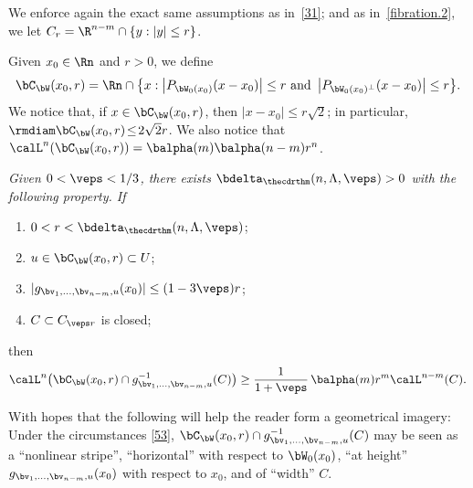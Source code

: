 \begin{Empty}
\label{51}
We enforce again the exact same assumptions as in~\ref{31}; and as in~\ref{fibration.2}, we let $C_r = \R^{n-m} \cap \{ y: |y| \leq r \}$.
\end{Empty}

\begin{Empty}[Polyballs]
\label{pb}
Given $x_0 \in \Rn$ and $r > 0$, we define
\begin{equation*}
\bC_\bW(x_0,r) = \Rn \cap \bigl\{ x: \left| P_{\bW_0(x_0)}(x-x_0)\right| \leq r \text{ and } \left| P_{\bW_0(x_0)^\perp}(x-x_0)\right| \leq r \bigr\}.
\end{equation*}
We notice that, if $x \in \bC_\bW(x_0,r)$, then $|x-x_0| \leq r \sqrt{2}$; in particular, $\rmdiam \bC_\bW(x_0,r) \!\leq\! 2 \sqrt{2}r$.
We also notice that $\calL^n(\bC_\bW(x_0,r)) = \balpha(m)\balpha(n-m)r^n$.
\end{Empty}

\begin{Empty}[]
\label{53}
{\it
Given $0 < \veps < 1/3$, there exists $\bdelta_{\thecdrthm}(n,\Lambda,\veps) > 0$ with the following property. If
\begin{enumerate}
\item\label{enum:43.1} $0 < r < \bdelta_{\thecdrthm}(n,\Lambda,\veps)$;
\item\label{enum:43.2} $u \in \bC_\bW(x_0,r) \subset U$;
\item\label{enum:43.3} $|g_{\bv_1,\ldots,\bv_{n-m},u}(x_0)| \leq (1-3\veps)r$;
\item\label{enum:43.4} $C \subset C_{\veps r}$ is closed;
\end{enumerate}
then
\begin{equation*}
\calL^n \bigl(\bC_\bW(x_0,r) \cap g_{\bv_1,\ldots,\bv_{n-m},u}^{-1}(C)\bigr) \geq \frac{1}{1+\veps}\, \balpha(m) r^m \calL^{n-m}(C).
\end{equation*}
}
\end{Empty}

\begin{Remark}
With hopes that the following will help the reader form a geometrical imagery: Under the circumstances \ref{53}, $\bC_\bW(x_0,r) \cap g_{\bv_1,\ldots,\bv_{n-m},u}^{-1}(C)$ may be seen as a ``nonlinear stripe'', ``horizontal'' with respect to $\bW_0(x_0)$, ``at height'' $g_{\bv_1,\ldots,\bv_{n-m},u}(x_0)$ with respect to $x_0$, and of ``width'' $C$.
\end{Remark}

